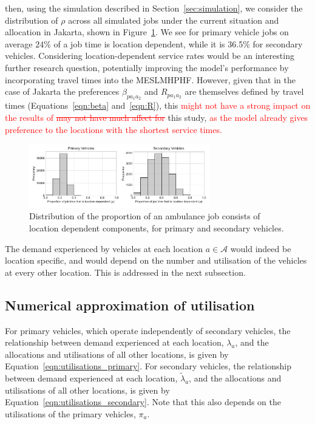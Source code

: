 \documentclass[numbers,webpdf,imaman]{ima-authoring-template}%
\begin{document}
\noindent
then, using the simulation described in Section~\ref{sec:simulation}, we
consider the distribution of $\rho$ across all simulated jobs under the current
situation and allocation in Jakarta, shown in Figure~\ref{fig:rho_distribution}.
We see for primary vehicle jobs on average 24\% of a job time is location
dependent, while it is 36.5\% for secondary vehicles. Considering
location-dependent service rates would be an interesting further research
question, potentially improving the model's performance by incorporating travel
times into the MESLMHPHF. However, given that in the case of Jakarta the
preferences $\beta_{p a_1 a_2}$ and $R_{p a_1 a_2}$ are themselves defined by
travel times (Equations~\ref{eqn:beta} and~\ref{eqn:R}), this \textcolor{red}{might not have a strong impact on the results of \st{may not have much
affect for}} this study, \textcolor{red}{as the model already gives preference to
the locations with the shortest service times.}

\begin{figure}
    \centering
    \includegraphics[width=0.7\textwidth]{img/location_dependant_service_time_proportion}
    \caption{Distribution of the proportion of an ambulance job consists of
    location dependent components, for primary and secondary vehicles.}
    \label{fig:rho_distribution}
\end{figure}

The demand experienced by vehicles at each location $a \in \mathcal{A}$ would
indeed be location specific, and would depend on the number and utilisation of
the vehicles at every other location. This is addressed in the next subsection.


\subsection{Numerical approximation of utilisation}
For primary vehicles, which operate independently of secondary vehicles, the
relationship between demand experienced at each location, $\lambda_a$, and the
allocations and utilisations of all other locations, is given by
Equation~\ref{eqn:utilisations_primary}. For secondary vehicles, the
relationship between demand experienced at each location, $\tilde{\lambda}_a$,
and the allocations and utilisations of all other locations, is given by
Equation~\ref{eqn:utilisations_secondary}. Note that this also depends on the
utilisations of the primary vehicles, $\pi_a$.
\end{document}
